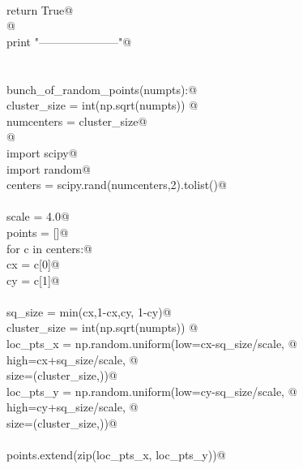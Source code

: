 \documentclass[11.5pt]{report}
\begin{document}
\begin{flushleft}
\begin{list}{}{}
\mbox{}\verb@@\\
\mbox{}\verb@    return True@\\
\mbox{}\verb@        @\\
\mbox{}\verb@    print "\n\n\n\n---------------------"@\\
\mbox{}\verb@@\\
\mbox{}\verb@@\\
\mbox{}\verb@def bunch_of_random_points(numpts):@\\
\mbox{}\verb@    cluster_size = int(np.sqrt(numpts)) @\\
\mbox{}\verb@    numcenters   = cluster_size@\\
\mbox{}\verb@    @\\
\mbox{}\verb@    import scipy@\\
\mbox{}\verb@    import random@\\
\mbox{}\verb@    centers = scipy.rand(numcenters,2).tolist()@\\
\mbox{}\verb@@\\
\mbox{}\verb@    scale = 4.0@\\
\mbox{}\verb@    points = []@\\
\mbox{}\verb@    for c in centers:@\\
\mbox{}\verb@        cx = c[0]@\\
\mbox{}\verb@        cy = c[1]@\\
\mbox{}\verb@@\\
\mbox{}\verb@        sq_size      = min(cx,1-cx,cy, 1-cy)@\\
\mbox{}\verb@        cluster_size = int(np.sqrt(numpts)) @\\
\mbox{}\verb@        loc_pts_x    = np.random.uniform(low=cx-sq_size/scale, @\\
\mbox{}\verb@                                         high=cx+sq_size/scale, @\\
\mbox{}\verb@                                         size=(cluster_size,))@\\
\mbox{}\verb@        loc_pts_y    = np.random.uniform(low=cy-sq_size/scale, @\\
\mbox{}\verb@                                         high=cy+sq_size/scale, @\\
\mbox{}\verb@                                         size=(cluster_size,))@\\
\mbox{}\verb@@\\
\mbox{}\verb@        points.extend(zip(loc_pts_x, loc_pts_y))@\\
\mbox{}\verb@@\\

\end{list}
\end{flushleft}
\end{document}
